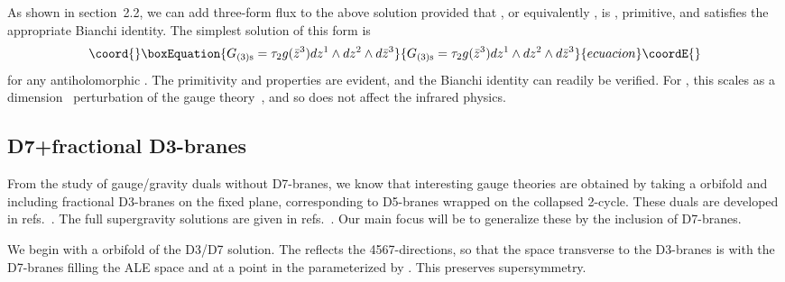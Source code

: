 \documentclass[a4paper,12pt]{article}
\renewcommand{\=}[1]{\bar{#1}}
\begin{document}
As shown in section~2.2, we can add
three-form flux to the above solution provided that \coordHE{}, or equivalently
\coordHE{},  is \coordHE{}, primitive, and satisfies the appropriate Bianchi
identity.  The simplest solution of this form is
\begin{equation}\coord{}\boxEquation{
G_{(3)\rm s} = \tau_2 g(\bar z^3) dz^1 \wedge dz^2 \wedge d\bar z^3
}{
G_{(3)\rm s} = \tau_2 g(\bar z^3) dz^1 \wedge dz^2 \wedge d\bar z^3
}{ecuacion}\coordE{}\end{equation}
for any antiholomorphic \coordHE{}.
The primitivity and \coordHE{} properties are evident, and the Bianchi identity can
readily be verified.  For \coordHE{}, this scales as a dimension~\coordHE{}
perturbation of the gauge theory~\cite{WGKP},
and so does not affect the infrared physics.

\subsection{D7+fractional D3-branes}

From the study of gauge/gravity duals without D7-branes, we know that
interesting gauge theories are obtained by taking a \coordHE{} orbifold and
including fractional D3-branes on the fixed plane, corresponding to D5-branes
wrapped on the collapsed 2-cycle.  These duals are developed in
refs.~\cite{GK-KN}.  The full \coordHE{} supergravity solutions are given in
refs.~\cite{n2,n2me}.  Our main focus will be to generalize these by the
inclusion of D7-branes.

We begin with a \coordHE{} orbifold of the D3/D7 solution.  The \coordHE{}
reflects the 4567-directions, so that the space transverse to the D3-branes is
\coordHE{} with the D7-branes filling the \coordHE{} ALE space and at a point in the \coordHE{} parameterized by
\coordHE{}.  This preserves \coordHE{} supersymmetry.
\end{document}
